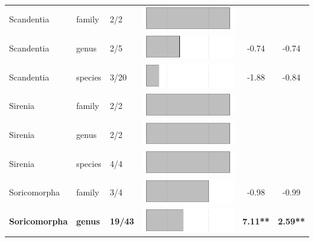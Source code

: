 \begin{longtable}{lL{1.8cm}C{2cm}lcc}
  Scandentia & family & 2/2 & \includegraphics[width=0.20\linewidth, height=0.05\linewidth]{Results_1c/Table_figures/bar73.pdf} &   &   \\ 
  Scandentia & genus & 2/5 & \includegraphics[width=0.20\linewidth, height=0.05\linewidth]{Results_1c/Table_figures/bar74.pdf} & -0.74 & -0.74 \\ 
  Scandentia & species & 3/20 & \includegraphics[width=0.20\linewidth, height=0.05\linewidth]{Results_1c/Table_figures/bar75.pdf} & -1.88 & -0.84 \\ 
  Sirenia & family & 2/2 & \includegraphics[width=0.20\linewidth, height=0.05\linewidth]{Results_1c/Table_figures/bar76.pdf} &   &   \\ 
  Sirenia & genus & 2/2 & \includegraphics[width=0.20\linewidth, height=0.05\linewidth]{Results_1c/Table_figures/bar77.pdf} &   &   \\ 
  Sirenia & species & 4/4 & \includegraphics[width=0.20\linewidth, height=0.05\linewidth]{Results_1c/Table_figures/bar78.pdf} &   &   \\ 
  Soricomorpha & family & 3/4 & \includegraphics[width=0.20\linewidth, height=0.05\linewidth]{Results_1c/Table_figures/bar79.pdf} & -0.98 & -0.99 \\ 
  \textbf{Soricomorpha} & \textbf{genus} & \textbf{19/43} & \includegraphics[width=0.20\linewidth, height=0.05\linewidth]{Results_1c/Table_figures/bar80.pdf} & \textbf{7.11**} & \textbf{2.59**} \\ 

\end{longtable}
